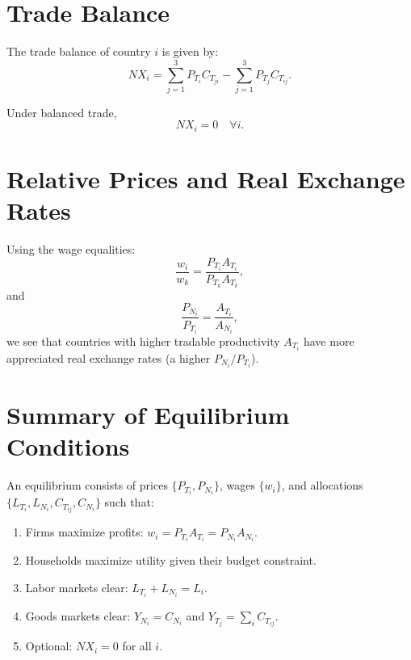 \documentclass[11pt]{article}
\begin{document}
\section{Trade Balance}

The trade balance of country \( i \) is given by:
\begin{equation}
NX_i = \sum_{j=1}^3 P_{T_i} C_{T_{ji}} - \sum_{j=1}^3 P_{T_j} C_{T_{ij}}.
\end{equation}

Under balanced trade,
\begin{equation}
NX_i = 0 \quad \forall i.
\end{equation}

\section{Relative Prices and Real Exchange Rates}

Using the wage equalities:
\begin{equation}
\frac{w_i}{w_k} = \frac{P_{T_i} A_{T_i}}{P_{T_k} A_{T_k}},
\end{equation}
and
\begin{equation}
\frac{P_{N_i}}{P_{T_i}} = \frac{A_{T_i}}{A_{N_i}},
\end{equation}
we see that countries with higher tradable productivity \( A_{T_i} \) have more appreciated real exchange rates (a higher \( P_{N_i}/P_{T_i} \)).

\section{Summary of Equilibrium Conditions}

An equilibrium consists of prices \( \{P_{T_i}, P_{N_i}\} \), wages \( \{w_i\} \), and allocations \( \{L_{T_i}, L_{N_i}, C_{T_{ij}}, C_{N_i}\} \) such that:
\begin{enumerate}
    \item Firms maximize profits: \( w_i = P_{T_i} A_{T_i} = P_{N_i} A_{N_i} \).
    \item Households maximize utility given their budget constraint.
    \item Labor markets clear: \( L_{T_i} + L_{N_i} = L_i \).
    \item Goods markets clear: \( Y_{N_i} = C_{N_i} \) and \( Y_{T_j} = \sum_i C_{T_{ij}} \).
    \item Optional: \( NX_i = 0 \) for all \( i \).
\end{enumerate}
\end{document}
